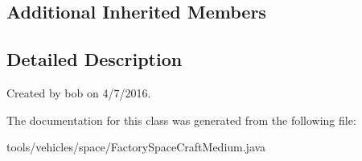 \subsection*{Additional Inherited Members}


\subsection{Detailed Description}
Created by bob on 4/7/2016. 

The documentation for this class was generated from the following file\+:\begin{DoxyCompactItemize}
\item 
tools/vehicles/space/Factory\+Space\+Craft\+Medium.\+java\end{DoxyCompactItemize}
